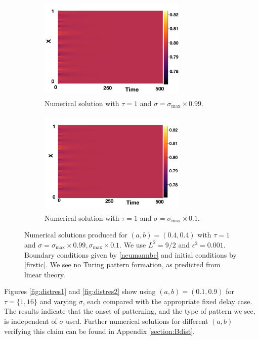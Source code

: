\begin{figure}[H]
    \centering
    \begin{subfigure}[t]{0.45\textwidth}
        \centering
        \includegraphics[width=7cm,height=5cm]{distp2sig1.png}
        \caption{Numerical solution with $\tau=1$ and $\sigma=\sigma_{\max}\times0.99$.}
        \label{}
    \end{subfigure}
    \hfill
    \begin{subfigure}[t]{0.45\textwidth}
        \centering
        \includegraphics[width=7cm,height=5cm]{distp2sig2.png}
        \caption{Numerical solution with $\tau=1$ and $\sigma=\sigma_{\max}\times0.1$.}
        \label{}
    \end{subfigure}
    \caption{Numerical solutions produced for $(a,b)=(0.4,0.4)$ with $\tau=1$ and $\sigma=\sigma_{\max}\times0.99, \sigma_{\max}\times0.1$. We use $L^2=9/2$ and $\epsilon^2=0.001$. Boundary conditions given by \eqref{neumannbc} and initial conditions by \eqref{firstic}. We see no Turing pattern formation, as predicted from linear theory.}
    \label{fig:testdist2}
\end{figure}
Figures \ref{fig:distres1} and \ref{fig:distres2} show  using $(a,b)=(0.1,0.9)$ for $\tau=\{1,16\}$ and varying $\sigma$, each compared with the appropriate fixed delay case. The results indicate that the onset of patterning, and the type of pattern we see, is independent of $\sigma$ used. Further numerical solutions for different $(a,b)$ verifying this claim can be found in Appendix \ref{section:Bdist}.

